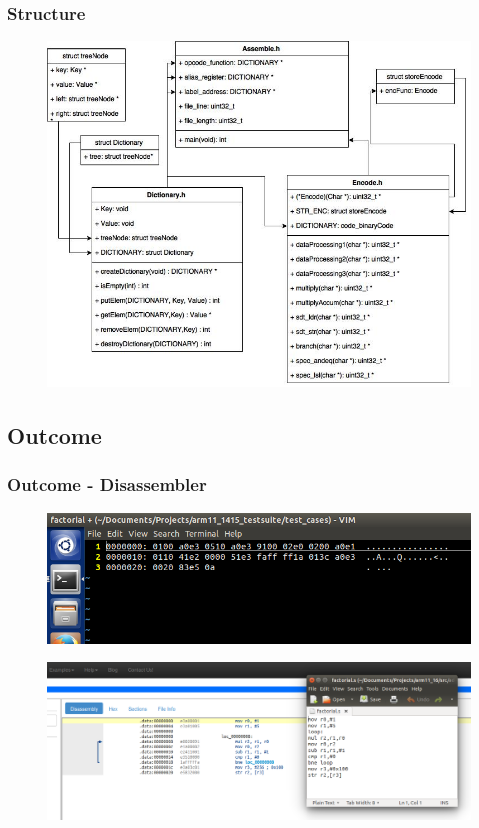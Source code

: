 \documentclass{beamer}
\begin{document}
\begin{frame}
\frametitle{Structure}

\begin{figure}[c]
\includegraphics[width=0.9\linewidth]{Images/Assembler_XML.jpg}
\end{figure}


\end{frame}

\subsection{Outcome}
\begin{frame}[fragile] %
\frametitle{Outcome - Disassembler}

\begin{figure}
\includegraphics[width=1\linewidth]{Images/Screen1.png}
\end{figure}

\begin{figure}
\includegraphics[width=1\linewidth]{Images/Screen2.png}
\end{figure}

\end{frame}
\end{document}
